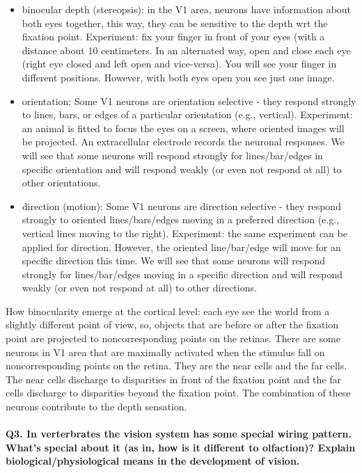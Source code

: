 \documentclass[12pt,article,oneside,a4paper]{memoir}
\begin{document}
\begin{itemize}
\item binocular depth (stereopsis): in the V1 area, neurons have information about both eyes together, this way, they can be sensitive to the depth wrt the fixation point. Experiment: fix your finger in front of your eyes (with a distance about 10 centimeters. In an alternated way, open and close each eye (right eye closed and left open and vice-versa). You will see your finger in different positions. However, with both eyes open you see just one image.
\item orientation: Some V1 neurons are orientation selective - they respond strongly to lines, bars, or edges of a particular orientation (e.g., vertical). Experiment: an animal is fitted to focus the eyes on a screen, where oriented images will be projected. An extracellular electrode records the neuronal responses. We will see that some neurons will respond strongly for lines/bar/edges in specific orientation and will respond weakly (or even not respond at all) to other orientations.
\item direction (motion): Some V1 neurons are direction selective - they respond strongly to oriented lines/bars/edges moving in a preferred direction (e.g., vertical lines moving to the right). Experiment: the same experiment can be applied for direction. However, the oriented line/bar/edge will move for an specific direction this time. We will see that some neurons will respond strongly for lines/bar/edges moving in a specific direction and will respond weakly (or even not respond at all) to other directions.
\end{itemize} 

How binocularity emerge at the cortical level: each eye see the world from a slightly different point of view, so, objects that are before or after the fixation point are projected to noncorresponding points on the retinas. There are some neurons in V1 area that are maximally activated when the stimulus fall on noncorresponding points on the retina. They are the near cells and the far cells. The near cells discharge to disparities in front of the fixation point and the far cells discharge to disparities beyond the fixation point. The combination of these neurons contribute to the depth sensation.

\paragraph{Q3. In verterbrates the vision system has some special wiring pattern. What's special about it (as in, how is it different to olfaction)? Explain biological/physiological means in the development of vision.}
\end{document}
